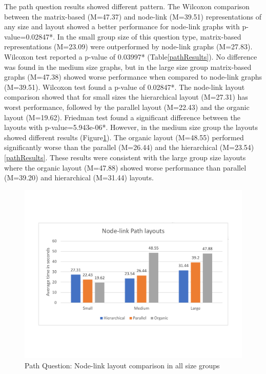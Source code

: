 \documentclass{l4proj}
\begin{document}
The path question results showed different pattern. The Wilcoxon comparison between the matrix-based (M=47.37) and node-link (M=39.51) representations of any size and layout showed a better performance for node-link graphs with p-value=0.02847*. In the small group size of this question type, matrix-based representations (M=23.09) were outperformed by node-link graphs (M=27.83). Wilcoxon test reported a p-value of 0.03997* (Table\ref{pathResults}). No difference was found in the medium size graphs, but in the large size group matrix-based graphs (M=47.38) showed worse performance when compared to node-link graphs (M=39.51). Wilcoxon test found a p-value of 0.02847*. The node-link layout comparison showed that for small sizes the hierarchical layout (M=27.31) has worst performance, followed by the parallel layout (M=22.43) and the organic layout (M=19.62). Friedman test found a significant difference between the layouts with p-value=5.943e-06*. However, in the medium size group the layouts showed different results (Figure\ref{nodePathLayouts}). The organic layout (M=48.55) performed significantly worse than the parallel (M=26.44) and the hierarchical (M=23.54) \ref{pathResults}. These results were consistent with the large group size layouts where the organic layout (M=47.88) showed worse performance than parallel (M=39.20) and hierarchical (M=31.44) layouts.


\begin{figure}[H]
\centering
\includegraphics[width=15cm]{nodePathLayouts.pdf}
\caption{Path Question: Node-link layout comparison in all size groups}
\label{nodePathLayouts}
\end{figure}
\end{document}
